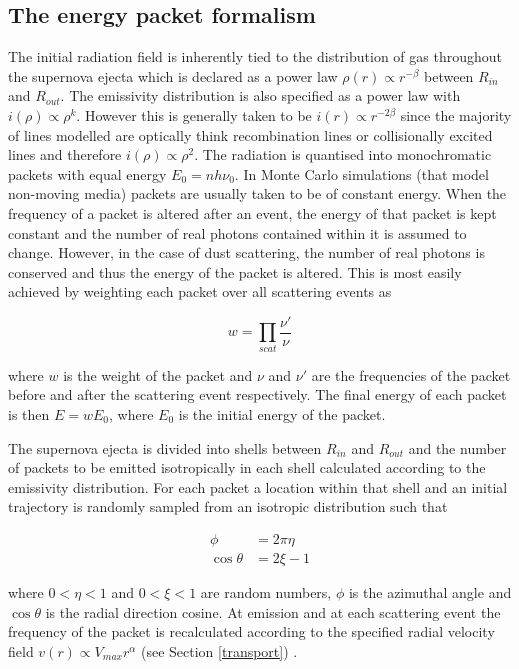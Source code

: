\documentclass[useAMS,usenatbib,usegraphicx]{mnras}
\begin{document}
\subsection{The energy packet formalism}
\label{packets}

The initial radiation field is inherently tied to the distribution of gas 
throughout the supernova ejecta which is declared as a power law $\rho(r) 
\propto r^{-\beta}$ between $R_{in}$ and $R_{out}$. The emissivity 
distribution is also specified as a power law with $i(\rho) \propto 
\rho^{k}$.  However this is generally taken to be $i(r) \propto r 
^{-2\beta}$ since the majority of lines modelled are optically think recombination lines or collisionally excited lines
and therefore $i(\rho) \propto \rho^2$.  The radiation is quantised into 
monochromatic packets with equal energy $E_{0}=nh\nu_{0}$.  In Monte Carlo 
simulations (that model non-moving media) packets are usually taken 
to be of constant energy.  When the frequency of a packet is altered after 
an event, the energy of that packet is kept constant and the number of 
real photons contained within it is assumed to change.  However, in the case 
of dust scattering, the number of real photons is conserved and thus the 
energy of the packet is altered.  This is most easily achieved by 
weighting each packet over all scattering events as 

\begin{equation}
w=\prod_{scat} \frac{\nu'}{\nu}
\end{equation} 

\noindent where $w$ is the weight of the packet and $\nu$ and $\nu'$ are the frequencies of the packet before and after the scattering event respectively.  The final 
energy of each packet is then $E=wE_0$, where $E_0$ is the initial energy 
of the packet.

The supernova ejecta is divided into shells between $R_{in}$ and $R_{out}$ 
and the number of packets to be emitted isotropically in each shell calculated according 
to the emissivity distribution.  For each packet 
a location within that shell and an initial trajectory is randomly sampled 
from an isotropic distribution such that

\begin{align}
\phi&=2\pi\eta \\
 \cos \theta&=2\xi -1
\end{align}

\noindent where $0<\eta<1$ and $0<\xi<1$ are random numbers, $\phi$ is the 
azimuthal angle and $\cos \theta$ is the radial direction cosine.  At 
emission and at each scattering event the frequency of the packet is 
recalculated according to the specified radial velocity field $v(r) 
\propto V_{max}r^{\alpha}$ (see Section \ref{transport}) .
\end{document}
